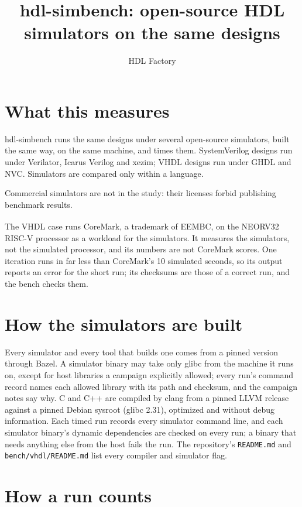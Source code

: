 \documentclass[11pt]{article}
\title{hdl-simbench: open-source HDL simulators on the same designs}
\author{HDL Factory}
\date{\ReportVersion}
\begin{document}
\maketitle

\section{What this measures}

hdl-simbench runs the same designs under several open-source simulators,
built the same way, on the same machine, and times them. SystemVerilog
designs run under Verilator, Icarus Verilog and xezim; VHDL designs run
under GHDL and NVC. Simulators are compared only within a language.

Commercial simulators are not in the study: their licenses forbid
publishing benchmark results.

The VHDL case runs CoreMark\textsuperscript{\textregistered}, a
trademark of EEMBC, on the NEORV32 RISC-V processor as a workload for the
simulators. It measures the simulators, not the simulated processor, and
its numbers are not CoreMark scores. One iteration runs in far less
than CoreMark's 10 simulated seconds, so its output reports an error for
the short run; its checksums are those of a correct run, and the bench
checks them.

\section{How the simulators are built}

Every simulator and every tool that builds one comes from a pinned
version through Bazel. A simulator binary may take only glibc from the
machine it runs on, except for host libraries a campaign explicitly
allowed; every run's command record names each allowed library with its
path and checksum, and the campaign notes say why.
C and C++ are compiled by clang from a pinned LLVM release against a
pinned Debian sysroot (glibc 2.31), optimized and without debug
information. Each timed run records every simulator command line, and each
simulator binary's dynamic dependencies are checked on every run; a binary
that needs anything else from the host fails the run. The
repository's \texttt{README.md} and \texttt{bench/vhdl/README.md} list
every compiler and simulator flag.

\section{How a run counts}
\end{document}
